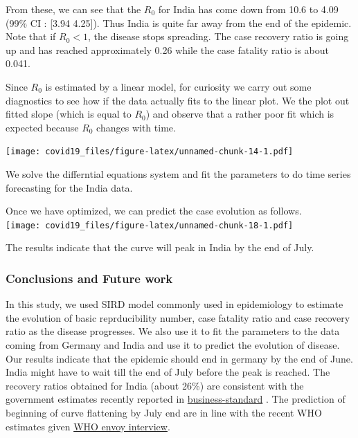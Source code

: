 \documentclass[]{article}
\begin{document}
From these, we can see that the \(R_{0}\) for India has come down from
10.6 to 4.09 (99\% CI : {[}3.94 4.25{]}). Thus India is quite far away
from the end of the epidemic. Note that if \(R_{0} < 1\), the disease
stops spreading. The case recovery ratio is going up and has reached
approximately 0.26 while the case fatality ratio is about 0.041.

Since \(R_{0}\) is estimated by a linear model, for curiosity we carry
out some diagnostics to see how if the data actually fits to the linear
plot. We the plot out fitted slope (which is equal to \(R_{0}\)) and
observe that a rather poor fit which is expected because \(R_{0}\)
changes with time.

\texttt{[image: covid19\_files/figure-latex/unnamed-chunk-14-1.pdf]}

We solve the differntial equations system and fit the parameters to do
time series forecasting for the India data.

Once we have optimized, we can predict the case evolution as follows.\\
\texttt{[image: covid19\_files/figure-latex/unnamed-chunk-18-1.pdf]}

The results indicate that the curve will peak in India by the end of
July.

\hypertarget{conclusions-and-future-work}{%
\subsubsection{Conclusions and Future
work}\label{conclusions-and-future-work}}

In this study, we used SIRD model commonly used in epidemiology to
estimate the evolution of basic reprducibility number, case fatality
ratio and case recovery ratio as the disease progresses. We also use it
to fit the parameters to the data coming from Germany and India and use
it to predict the evolution of disease. Our results indicate that the
epidemic should end in germany by the end of June. India might have to
wait till the end of July before the peak is reached. The recovery
ratios obtained for India (about 26\%) are consistent with the
government estimates recently reported in
\href{https://www.business-standard.com/article/current-affairs/covid-19-factoid-india-s-recovery-rate-improves-to-30-from-10-in-april-120050900106_1.html}{business-standard}
. The prediction of beginning of curve flattening by July end are in
line with the recent WHO estimates given
\href{https://www.ndtv.com/india-news/indias-covid-curve-likely-to-flatten-reach-peak-by-july-end-who-envoy-2225754}{WHO
envoy interview}.
\end{document}
